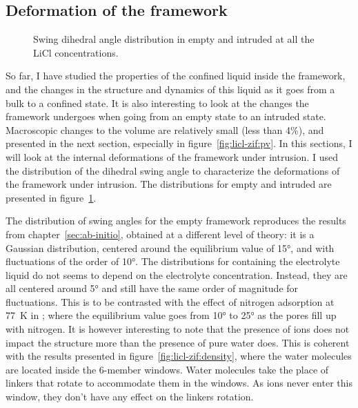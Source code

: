 \documentclass[thesis]{subfiles}
\begin{document}
\subsection{Deformation of the framework}
\label{sec:licl-zifdeformation}

\begin{figure}[ht]
    \centering
    
    \caption{Swing dihedral angle distribution in empty and intruded  at
    all the LiCl concentrations.}
    \label{fig:licl-zif:dihedrals}
\end{figure}

So far, I have studied the properties of the confined liquid inside the 
framework, and the changes in the structure and dynamics of this liquid as it
goes from a bulk to a confined state. It is also interesting to look at the
changes the framework undergoes when going from an empty state to an intruded
state. Macroscopic changes to the volume are relatively small (less than 4\%),
and presented in the next section, especially in figure~\ref{fig:licl-zif:pv}.
In this sections, I will look at the internal deformations of the framework
under intrusion. I used the distribution of the  dihedral swing
angle to characterize the deformations of the framework under intrusion. The
distributions for empty and intruded  are presented in
figure~\ref{fig:licl-zif:dihedrals}.

The distribution of swing angles for the empty framework reproduces the results
from chapter~\ref{sec:ab-initio}, obtained at a different level of theory: it is
a Gaussian distribution, centered around the equilibrium value of 15°, and with
fluctuations of the order of 10°. The distributions for  containing the
electrolyte liquid do not seems to depend on the electrolyte concentration.
Instead, they are all centered around 5° and still have the same order of
magnitude for fluctuations. This is to be contrasted with the effect of nitrogen
adsorption at \SI{77}{K} in ; where the equilibrium value goes from 10° to
25° as the pores fill up with nitrogen. It is however interesting to note that
the presence of ions does not impact the structure more than the presence of
pure water does. This is coherent with the results presented in
figure~\ref{fig:licl-zif:density}, where the water molecules are located inside
the 6-member windows. Water molecules take the place of linkers that rotate to
accommodate them in the windows. As ions never enter this window, they don't
have any effect on the linkers rotation.
\end{document}
